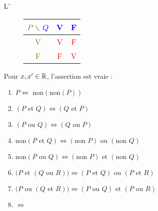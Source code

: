 \begin{frame}
L' 

\pause
\bigskip

\begin{figure}[H]
\centering
\begin{tabular}{c|c|c}
\textcolor{olive}{$P$} $\backslash$ \textcolor{blue}{$Q$}  & \textcolor{blue}{V} & \textcolor{blue}{F} \\ \hline
\textcolor{olive}{V} & \textcolor{red}{V} & \textcolor{red}{F} \\ \hline
\textcolor{olive}{F} & \textcolor{red}{F} & \textcolor{red}{V} \\ 
\end{tabular}
\end{figure}


\pause
\bigskip

Pour $x,x' \in \mathbb{R}$, l'assertion est vraie :

\centerline{} 

\end{frame}


\begin{frame}
\begin{proposition}
\label{prop:log}
\begin{enumerate}
  \item<1-> $P \iff \text{ non}(\text{non}(P))$
  \item<2-> $(P \text{ et } Q) \iff (Q \text{ et } P)$
  \item<3-> $(P \text{ ou } Q) \iff (Q \text{ ou } P)$
  \item<4-> $\text{non}(P \text{ et } Q)  \iff  (\text{non } P)  \text{ ou } (\text{non }Q)$
  \item<5-> $\text{non}(P \text{ ou } Q)  \iff  (\text{non } P)  \text{ et } (\text{non }Q)$
  \item<6-> $\big(P \text{ et } (Q \text{ ou } R)  \big)   \iff 
(P \text{ et } Q) \text{ ou } (P \text{ et }  R)$
  \item<7-> $\big(P \text{ ou } (Q \text{ et } R)  \big)   \iff 
(P \text{ ou } Q) \text{ et } (P \text{ ou }  R)$
  \item<8->   $\iff$ 
\end{enumerate}
\end{proposition}
\end{frame}



